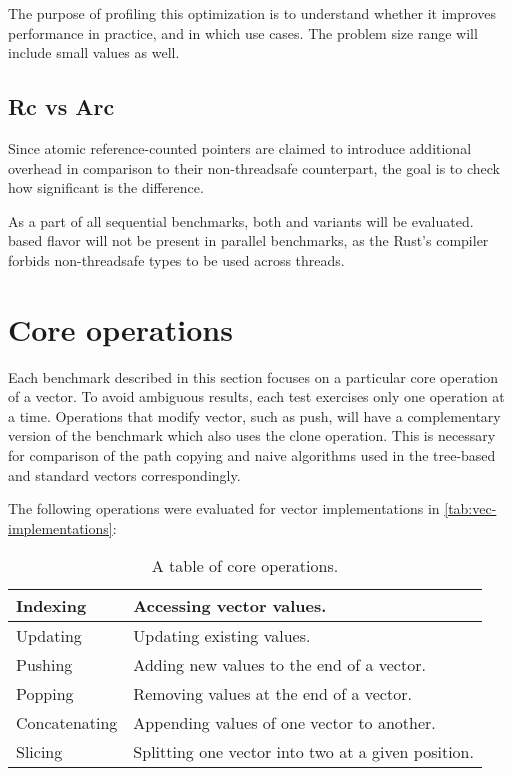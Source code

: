 The purpose of profiling this optimization is to understand whether it improves performance in practice, and in which use cases. The problem size range will include small values as well.

\subsection{Rc vs Arc}
Since atomic reference-counted pointers are claimed to introduce additional overhead in comparison to their non-threadsafe counterpart, the goal is to check how significant is the difference.

As a part of all sequential benchmarks, both \rc{} and \arc{} variants will be evaluated. \rc{} based flavor will not be present in parallel benchmarks, as the Rust's compiler forbids non-threadsafe types to be used across threads.


\section{Core operations}
Each benchmark described in this section focuses on a particular core operation of a vector. To avoid ambiguous results, each test exercises only one operation at a time. Operations that modify vector, such as push, will have a complementary version of the benchmark which also uses the clone operation. This is necessary for comparison of the path copying and naive algorithms used in the tree-based and standard vectors correspondingly.

The following operations were evaluated for vector implementations in \ref{tab:vec-implementations}:
\begin{table}[!htbp]
    \centering

    \begin{tabular} { |l| p{10cm} | }
        \hline
        Indexing & Accessing vector values. \\ \hline
        Updating & Updating existing values. \\ \hline
        Pushing & Adding new values to the end of a vector. \\ \hline
        Popping & Removing values at the end of a vector. \\ \hline
        Concatenating & Appending values of one vector to another. \\ \hline
        Slicing & Splitting one vector into two at a given position. \\ \hline
    \end{tabular}

    \label{tab:vec-core-operations}
    \caption{A table of core operations.}
\end{table}


